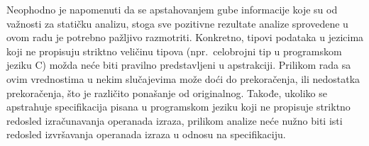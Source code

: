 Neophodno je napomenuti da se apstahovanjem gube informacije koje su od važnosti za statičku analizu, stoga sve pozitivne rezultate analize sprovedene u ovom radu je potrebno pažljivo razmotriti. Konkretno, tipovi podataka u jezicima koji ne propisuju striktno veličinu tipova (npr.~celobrojni tip u programskom jeziku C) možda neće biti pravilno predstavljeni u apstrakciji. Prilikom rada sa ovim vrednostima u nekim slučajevima može doći do prekoračenja, ili nedostatka prekoračenja, što je različito ponašanje od originalnog. Takođe, ukoliko se apstrahuje specifikacija pisana u programskom jeziku koji ne propisuje striktno redosled izračunavanja operanada izraza, prilikom analize neće nužno biti isti redosled izvršavanja operanada izraza u odnosu na specifikaciju.



